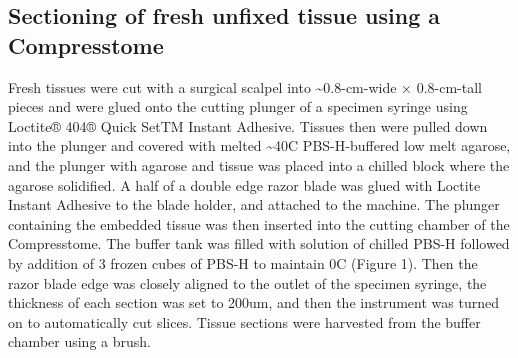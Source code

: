 \documentclass{article}
\begin{document}
\subsection*{Sectioning of fresh unfixed tissue using a Compresstome}

Fresh tissues were cut with a surgical scalpel into \textasciitilde{}0.8-cm-wide × 0.8-cm-tall pieces and were glued onto the cutting plunger of a specimen syringe using Loctite® 404® Quick SetTM Instant Adhesive. Tissues then were pulled down into the plunger and covered with melted \textasciitilde{}40C PBS-H-buffered low melt agarose, and the plunger with agarose and tissue was placed into a chilled block where the agarose solidified. A half of a double edge razor blade was glued with Loctite Instant Adhesive to the blade holder, and attached to the machine. The plunger containing the embedded tissue was then inserted into the cutting chamber of the Compresstome. The buffer tank was filled with solution of chilled PBS-H followed by addition of 3 frozen cubes of PBS-H to maintain 0C (Figure 1). Then the razor blade edge was closely aligned to the outlet of the specimen syringe, the thickness of each section was set to 200um, and then the instrument was turned on to automatically cut slices. Tissue sections were harvested from the buffer chamber using a brush.
\end{document}
